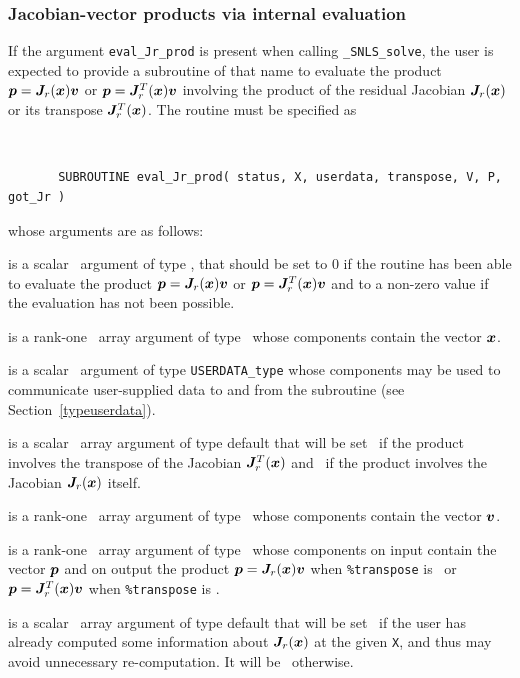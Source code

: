 \documentclass{galahad}
\newcommand{\packagename}{SNLS}
\newcommand{\fullpackagename}{\libraryname\_\packagename}
\newcommand{\solver}{{\tt \fullpackagename\_solve}}
\begin{document}

\subsubsection{Jacobian-vector products via internal evaluation\label{jvp}}

If the argument {\tt eval\_Jr\_prod} is present when calling \solver, the
user is expected to provide a subroutine of that name to evaluate the
product ${\bm{p}} = {\bm{J}}_r({\bm{x}}) {\bm{v}}$ or ${\bm{p}} = {\bm{J}}_r^T({\bm{x}}) {\bm{v}}$ involving the
product of the residual Jacobian ${\bm{J}}_r({\bm{x}})$ or its transpose 
${\bm{J}}_r^T({\bm{x}})$. The routine must be specified as

\def\baselinestretch{0.8}
{\tt
\begin{verbatim}
       SUBROUTINE eval_Jr_prod( status, X, userdata, transpose, V, P, got_Jr )
\end{verbatim} }
\def\baselinestretch{1.0}
\noindent whose arguments are as follows:

\begin{description}
 is a scalar \intentout\ argument of type \integer,
that should be set to 0 if the routine has been able to evaluate the
product ${\bm{p}} = {\bm{J}}_r({\bm{x}}) {\bm{v}}$ or ${\bm{p}} = {\bm{J}}_r^T({\bm{x}}) {\bm{v}}$
and to a non-zero value if the evaluation has not been possible.

 is a rank-one \intentin\ array argument of type \realdp\
whose components contain the vector ${\bm{x}}$.

 is a scalar \intentinout\ argument of type
{\tt USERDATA\_type} whose components may be used
to communicate user-supplied data to and from the subroutine
(see Section~\ref{typeuserdata}).

 is a scalar \intentin\ array argument of type
default that will be set \true\ if the product involves the transpose
of the Jacobian ${\bm{J}}_r^T({\bm{x}})$ and \false\ if the product involves
the Jacobian ${\bm{J}}_r({\bm{x}})$ itself.

 is a rank-one \intentin\ array argument of type \realdp\
whose components contain the vector ${\bm{v}}$.

 is a rank-one \intentinout\ array argument of type \realdp\
whose components on input contain the vector ${\bm{p}}$ and on output the
product ${\bm{p}} = {\bm{J}}_r({\bm{x}}) {\bm{v}}$ when {\tt \%transpose} is \false\ or
${\bm{p}} = {\bm{J}}_r^T({\bm{x}}) {\bm{v}}$ when {\tt \%transpose} is \true.

\itt{got\_Jr} is a scalar \intentin\ array argument of type
default that will be set \true\ if the user has already computed
some information about ${\bm{J}}_r({\bm{x}})$ at the given {\tt X}, and thus
may avoid unnecessary re-computation. It will be \false\ otherwise.

\end{description}
\end{document}
